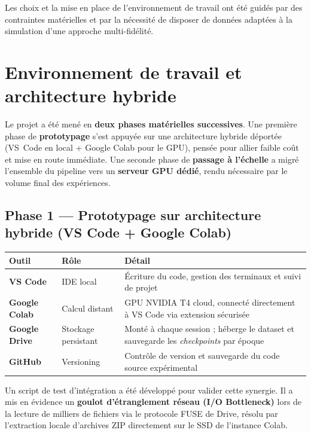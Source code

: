 \documentclass[11pt,a4paper,openany]{book}
\newcommand{\tableheadcolor}{\rowcolor{headerbg}}
\newcommand{\tablerowodd}{}
\begin{document}
Les choix et la mise en place de l'environnement de travail ont été guidés par des contraintes matérielles et par la nécessité de disposer de données adaptées à la simulation d'une approche multi-fidélité.

\section{Environnement de travail et architecture hybride}

Le projet a été mené en \textbf{deux phases matérielles successives}. Une première phase de \textbf{prototypage} s'est appuyée sur une architecture hybride déportée (VS~Code en local + Google Colab pour le GPU), pensée pour allier faible coût et mise en route immédiate. Une seconde phase de \textbf{passage à l'échelle} a migré l'ensemble du pipeline vers un \textbf{serveur GPU dédié}, rendu nécessaire par le volume final des expériences.

\subsection*{Phase 1 — Prototypage sur architecture hybride (VS Code + Google Colab)}

\vspace{0.4em}
\renewcommand{\arraystretch}{1.4}
\begin{tabularx}{\linewidth}{C{2.8cm} L{3.5cm} L{9.5cm}}
  \toprule
  \tableheadcolor
  \textbf{Outil} &
  \textbf{Rôle} &
  \textbf{Détail} \\
  \midrule
  \tablerowodd
  \textbf{VS Code} & IDE local & Écriture du code, gestion des terminaux et suivi de projet \\
  \textbf{Google Colab} & Calcul distant & GPU NVIDIA T4 cloud, connecté directement à VS Code via extension sécurisée \\
  \tablerowodd
  \textbf{Google Drive} & Stockage persistant & Monté à chaque session ; héberge le dataset et sauvegarde les \textit{checkpoints} par époque \\
  \textbf{GitHub} & Versioning & Contrôle de version et sauvegarde du code source expérimental \\
  \bottomrule
\end{tabularx}

\vspace{0.5em}
Un script de test d'intégration a été développé pour valider cette synergie. Il a mis en évidence un \textbf{goulot d'étranglement réseau (I/O Bottleneck)} lors de la lecture de milliers de fichiers via le protocole FUSE de Drive, résolu par l'extraction locale d'archives ZIP directement sur le SSD de l'instance Colab.
\end{document}
